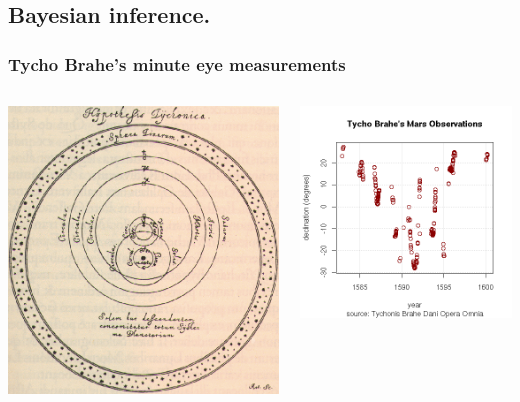 \documentclass{beamer}
\begin{document}
\subsection{Bayesian inference.}
\begin{frame}
  \frametitle{Tycho Brahe's minute eye measurements}
  \begin{columns}
    \begin{column}{0.5\textwidth}
      \includegraphics[width=\columnwidth]{../figures/circular-orbits}
    \end{column}
    \begin{column}{0.5\textwidth}
      \includegraphics[width=\columnwidth]{../figures/tycho-observations}

\end{column}
\end{columns}
\end{frame}
\end{document}
